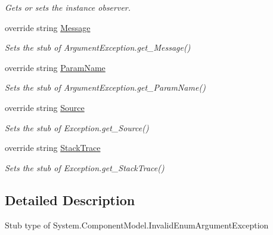\begin{DoxyCompactItemize}
\begin{DoxyCompactList}\small\item\em Gets or sets the instance observer.\end{DoxyCompactList}\item 
override string \hyperlink{class_system_1_1_component_model_1_1_fakes_1_1_stub_invalid_enum_argument_exception_a48618a5efa169f5275218301e2114abd}{Message}
\begin{DoxyCompactList}\small\item\em Sets the stub of Argument\-Exception.\-get\-\_\-\-Message()\end{DoxyCompactList}\item 
override string \hyperlink{class_system_1_1_component_model_1_1_fakes_1_1_stub_invalid_enum_argument_exception_a904bb92525c1e626d7638a93dba37e26}{Param\-Name}
\begin{DoxyCompactList}\small\item\em Sets the stub of Argument\-Exception.\-get\-\_\-\-Param\-Name()\end{DoxyCompactList}\item 
override string \hyperlink{class_system_1_1_component_model_1_1_fakes_1_1_stub_invalid_enum_argument_exception_ad0679e9d206d9aa56fbcbde42ea32dd1}{Source}
\begin{DoxyCompactList}\small\item\em Sets the stub of Exception.\-get\-\_\-\-Source()\end{DoxyCompactList}\item 
override string \hyperlink{class_system_1_1_component_model_1_1_fakes_1_1_stub_invalid_enum_argument_exception_a1f1325a78c7a45e9368189569d47f985}{Stack\-Trace}
\begin{DoxyCompactList}\small\item\em Sets the stub of Exception.\-get\-\_\-\-Stack\-Trace()\end{DoxyCompactList}\end{DoxyCompactItemize}


\subsection{Detailed Description}
Stub type of System.\-Component\-Model.\-Invalid\-Enum\-Argument\-Exception



